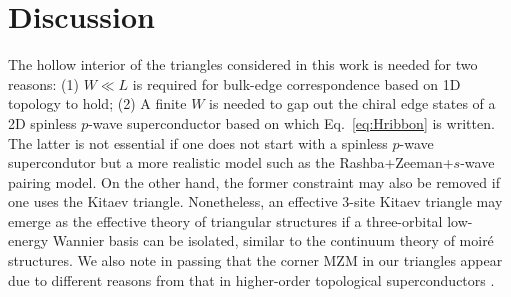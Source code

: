 \section{Discussion}

The hollow interior of the triangles considered in this work is needed for two reasons: (1) $W\ll L$ is required for bulk-edge correspondence based on 1D topology to hold; (2) A finite $W$ is needed to gap out the chiral edge states of a 2D spinless $p$-wave superconductor based on which Eq.~\eqref{eq:Hribbon} is written. The latter is not essential if one does not start with a spinless $p$-wave supercondutor but a more realistic model such as the Rashba+Zeeman+$s$-wave pairing model. On the other hand, the former constraint may also be removed if one uses the Kitaev triangle. Nonetheless, an effective 3-site Kitaev triangle may emerge as the effective theory of triangular structures if a three-orbital low-energy Wannier basis can be isolated, similar to the continuum theory of moir\'{e} structures. We also note in passing that the corner MZM in our triangles appear due to different reasons from that in higher-order topological superconductors \cite{wangEvidenceMajoranaBound2018,pahomiBraidingMajoranaCorner2020}.

